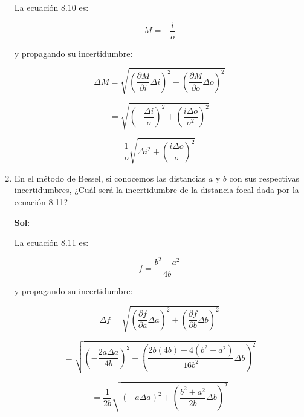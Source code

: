 \documentclass[12pt,a4paper]{article}
\begin{document}
\begin{enumerate}
La ecuación 8.10 es:

\begin{equation*}
    M = -\frac{i}{o}
\end{equation*}

y propagando su incertidumbre:

\begin{equation*}
    \Delta M = \sqrt{\left(\frac{\partial M}{\partial i} \Delta i\right)^{2} + \left(\frac{\partial M}{\partial o} \Delta o\right)^{2}}
\end{equation*}

\begin{equation*}
    = \sqrt{\left(-\frac{\Delta i}{o}\right)^{2}+ \left(\frac{i\Delta o}{o^2}\right)^{2}}
\end{equation*}

\begin{equation*}
    \frac{1}{o}\sqrt{\Delta i^2 + \left(\frac{i\Delta o}{o}\right)^2}
\end{equation*}







\item En el método de Bessel, si conocemos las distancias $a$ y $b$ con sus respectivas incertidumbres, ¿Cuál será la incertidumbre de la distancia focal dada por la ecuación 8.11?

\textbf{Sol}:

La ecuación 8.11 es:

\begin{equation*}
    f = \frac{b^2-a^2}{4b}
\end{equation*}

y propagando su incertidumbre:

\begin{equation*}
    \Delta f = \sqrt{\left(\frac{\partial f}{\partial a} \Delta a\right)^2 + \left(\frac{\partial f}{\partial b}\Delta b\right)^2}
\end{equation*}

\begin{equation*}
    = \sqrt{\left(-\frac{2a\Delta a}{4b}\right)^{2}+\left(\frac{2b(4b)-4(b^2-a^2)}{16b^2}\Delta b\right)^{2}}
\end{equation*}

\begin{equation*}
    =\frac{1}{2b}\sqrt{\left(-a\Delta a\right)^{2}+\left(\frac{b^2+a^2}{2b}\Delta b\right)^{2}}
\end{equation*}

    
    
\end{enumerate}
\end{document}
